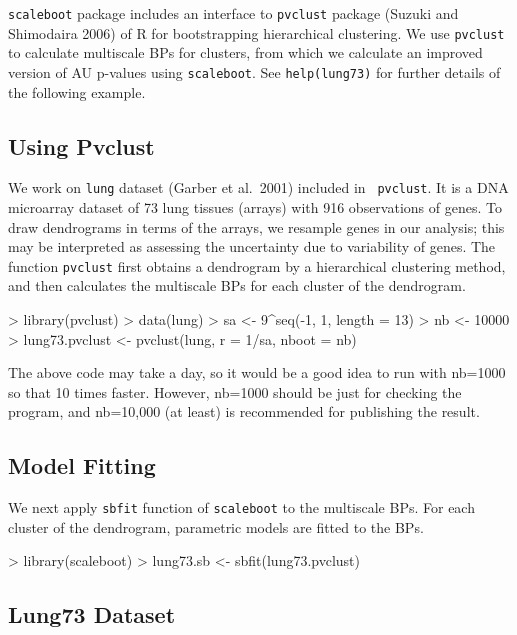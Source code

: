 \documentclass[a4paper]{amsart}
\begin{document}
{\tt scaleboot} package includes an interface to {\tt pvclust} package
(Suzuki and Shimodaira 2006) of R for bootstrapping hierarchical
clustering.  We use {\tt pvclust} to calculate multiscale BPs for
clusters, from which we calculate an improved version of AU p-values
using {\tt scaleboot}. See {\tt help(lung73)} for further details of
the following example.

\subsection{Using Pvclust}

We work on {\tt lung} dataset (Garber et al.~2001) included in {\tt
pvclust}.  It is a DNA microarray dataset of 73 lung tissues (arrays)
with 916 observations of genes.  To draw dendrograms in terms of the
arrays, we resample genes in our analysis; this may be interpreted as
assessing the uncertainty due to variability of genes.  The function
{\tt pvclust} first obtains a dendrogram by a hierarchical clustering
method, and then calculates the multiscale BPs for each cluster of the
dendrogram.
\begin{Schunk}
\begin{Sinput}
> library(pvclust)
> data(lung)
> sa <- 9^seq(-1, 1, length = 13)
> nb <- 10000
> lung73.pvclust <- pvclust(lung, r = 1/sa, nboot = nb)
\end{Sinput}
\end{Schunk}
The above code may take a day, so it would be a good idea to run with
nb=1000 so that 10 times faster. However, nb=1000 should be just
for checking the program, and nb=10,000 (at least) is recommended for
publishing the result. 

\subsection{Model Fitting}

We next apply {\tt sbfit} function of {\tt scaleboot} to the
multiscale BPs. For each cluster of the dendrogram, parametric models
are fitted to the BPs.
\begin{Schunk}
\begin{Sinput}
> library(scaleboot)
> lung73.sb <- sbfit(lung73.pvclust)
\end{Sinput}
\end{Schunk}

\subsection{Lung73 Dataset}
\end{document}
